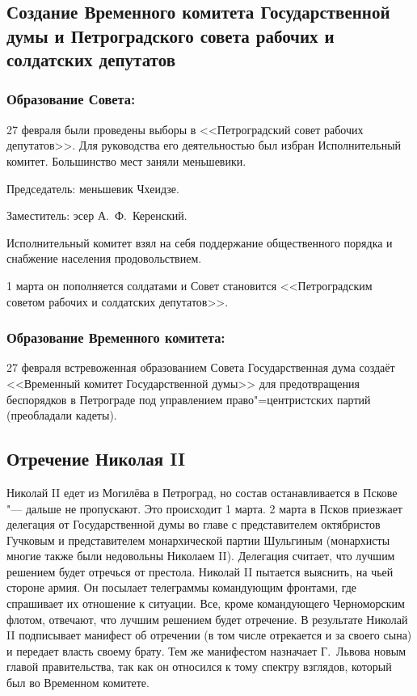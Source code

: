 \subsection{Создание Временного комитета Государственной думы и Петроградского совета рабочих и солдатских депутатов}

\subsubsection{\textbf{Образование Совета:}}

27 февраля были проведены выборы в <<Петроградский совет рабочих депутатов>>. Для руководства его деятельностью был избран Исполнительный комитет. Большинство мест заняли меньшевики.

Председатель: меньшевик Чхеидзе.

Заместитель: эсер А.~Ф.~Керенский.

Исполнительный комитет взял на себя поддержание общественного порядка и снабжение населения продовольствием.

1 марта он пополняется солдатами и Совет становится <<Петроградским советом рабочих и солдатских депутатов>>.

\subsubsection{\textbf{Образование Временного комитета:}}

27 февраля встревоженная образованием Совета Государственная дума создаёт <<Временный комитет Государственной думы>> для предотвращения беспорядков в Петрограде под управлением право"=центристских партий (преобладали кадеты). 

\subsection{Отречение Николая II}

Николай II едет из Могилёва в Петроград, но состав останавливается в Пскове "--- дальше не пропускают. Это происходит 1 марта. 2 марта в Псков приезжает делегация от Государственной думы во главе с представителем октябристов Гучковым и представителем монархической партии Шульгиным (монархисты многие также были недовольны Николаем II). Делегация считает, что лучшим решением будет отречься от престола. Николай II пытается выяснить, на чьей стороне армия. Он посылает телеграммы командующим фронтами, где спрашивает их отношение к ситуации. Все, кроме командующего Черноморским флотом, отвечают, что лучшим решением будет отречение. В результате Николай II подписывает манифест об отречении (в том числе отрекается и за своего сына) и передает власть своему брату. Тем же манифестом назначает Г.~Львова новым главой правительства, так как он относился к тому спектру взглядов, который был во Временном комитете.

